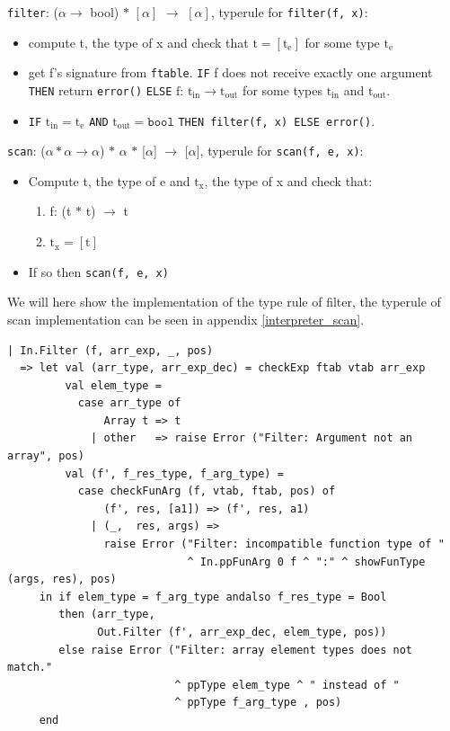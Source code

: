 \documentclass[11pt]{article}
\begin{document}
    \texttt{filter}: ($\alpha \rightarrow$ bool) $\ast$ $[\alpha]$ $\rightarrow$
    $[\alpha]$, typerule for \texttt{filter(f, x)}:
    \vspace{-2.5mm}
    \begin{itemize}[noitemsep]
        \item compute t, the type of x and check that $\text{t} =
            [\text{t}_\text{e}]$ for some type $\text{t}_\text{e}$
        \item get f's signature from \texttt{ftable}. \texttt{IF} f does not
            receive exactly one argument \texttt{THEN} return \texttt{error()}
            \texttt{ELSE} $\text{f: t}_{\text{in}} \rightarrow
            \text{t}_{\text{out}}$ for some types $\text{t}_{\text{in}}$ and
            $\text{t}_{\text{out}}$.
        \item \texttt{IF} $\text{t}_{\text{in}} = \text{t}_\text{e}$
            \texttt{AND} $\text{t}_{\text{out}} = \texttt{bool}$ \texttt{THEN
            filter(f, x) ELSE error()}.
    \end{itemize}

    \texttt{scan}: ($\alpha \ast \alpha \rightarrow \alpha$) $\ast$ $\alpha$
    $\ast$ [$\alpha$] $\rightarrow$ [$\alpha$], typerule for
    \texttt{scan(f, e, x)}:
    \vspace{-2.5mm}
    \begin{itemize}[noitemsep]
        \item Compute t, the type of e and $\text{t}_\text{x}$, the type of x
            and check that:
        	\begin{enumerate}[noitemsep]
        	   \item f: (t $\ast$ t) $\rightarrow$ t
        	   \item $\text{t}_\text{x} = [\text{t}]$
    		\end{enumerate}
        \item If so then \texttt{scan(f, e, x)}
    \end{itemize}

    We will here show the implementation of the type rule of filter, the
    typerule of scan implementation can be seen in appendix
    \ref{interpreter_scan}.

    \begin{lstlisting}[firstnumber=244]
| In.Filter (f, arr_exp, _, pos)
  => let val (arr_type, arr_exp_dec) = checkExp ftab vtab arr_exp
         val elem_type =
           case arr_type of
               Array t => t
             | other   => raise Error ("Filter: Argument not an array", pos)
         val (f', f_res_type, f_arg_type) =
           case checkFunArg (f, vtab, ftab, pos) of
               (f', res, [a1]) => (f', res, a1)
             | (_,  res, args) =>
               raise Error ("Filter: incompatible function type of "
                            ^ In.ppFunArg 0 f ^ ":" ^ showFunType (args, res), pos)
     in if elem_type = f_arg_type andalso f_res_type = Bool
        then (arr_type,
              Out.Filter (f', arr_exp_dec, elem_type, pos))
        else raise Error ("Filter: array element types does not match."
                          ^ ppType elem_type ^ " instead of "
                          ^ ppType f_arg_type , pos)
     end
    \end{lstlisting}
\end{document}
